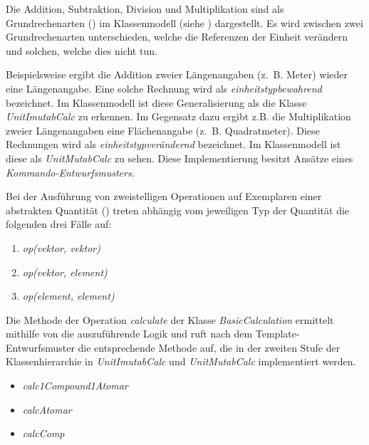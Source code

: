 \label{Berechnungen}


Die Addition, Subtraktion, Division und Multiplikation sind als Grundrechenarten () im Klassenmodell (siehe ) dargestellt. 
Es wird zwischen zwei Grundrechenarten unterschieden, welche die Referenzen der Einheit verändern und solchen, welche dies nicht tun. 

Beispielsweise ergibt die Addition zweier Längenangaben (z.~B. Meter) wieder eine Längenangabe. 
Eine solche Rechnung wird als \emph{einheitstypbewahrend} bezeichnet. Im Klassenmodell ist diese Generalisierung als die Klasse \textit{UnitImutabCalc} zu erkennen. 
Im Gegensatz dazu ergibt z.B. die Multiplikation zweier Längenangaben eine Flächenangabe (z.~B. Quadratmeter). 
Diese Rechnungen wird als \emph{einheitstypverändernd} bezeichnet. Im Klassenmodell ist diese als \textit{UnitMutabCalc} zu sehen. 
Diese Implementierung besitzt Ansätze eines \emph{Kommando-Entwurfsmusters}.

\newpage
{}

Bei der Ausführung von zweistelligen Operationen auf Exemplaren einer abstrakten Quantität () treten abhängig vom jeweiligen Typ der Quantität die folgenden drei Fälle auf:
\begin{enumerate}
\item \textit{op(vektor, vektor)}
\item \textit{op(vektor, element)}
\item \textit{op(element, element)}
\end{enumerate}

Die Methode der Operation \textit{calculate} der Klasse \textit{BasicCalculation} ermittelt mithilfe von  die auszuführende Logik und ruft nach dem Template-Entwurfsmuster die entsprechende Methode auf, 
die in der zweiten Stufe der Klassenhierarchie in \textit{UnitImutabCalc} und \textit{UnitMutabCalc} implementiert werden.
\begin{itemize}
\item \textit{calc1Compound1Atomar}
\item \textit{calcAtomar}
\item \textit{calcComp}
\end{itemize}


